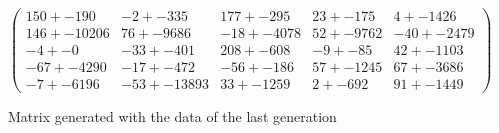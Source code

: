 \documentclass[]{report} %
\begin{document}
    \begin{figure}[H] 
            \centering
            \small
    $
          \begin{pmatrix}
                150 +- 190 & -2 +- 335 & 177 +- 295 & 23 +- 175 & 4 +- 1426 \\
                146 +- 10206 & 76 +- 9686 & -18 +- 4078 & 52 +- 9762 & -40 +- 2479 \\
                -4 +- 0 & -33 +- 401 & 208 +- 608 & -9 +- 85 & 42 +- 1103 \\
                -67 +- 4290 & -17 +- 472 & -56 +- 186 & 57 +- 1245 & 67 +- 3686 \\
                -7 +- 6196 & -53 +- 13893 & 33 +- 1259 & 2 +- 692 & 91 +- 1449 
           \end{pmatrix}
    $
            \caption{\footnotesize Matrix generated with the data of the last generation}
            \label{mat:ps300xg200xmr1-10-4xalt1}
    \end{figure}
    
    
\end{document}

